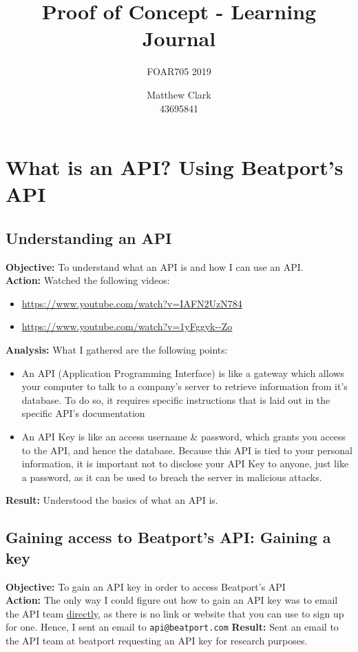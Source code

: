 \documentclass{article}
\title{Proof of Concept - Learning Journal}
\subtitle{FOAR705 2019}
\author{Matthew Clark\\43695841}
\date{\vspace{-5ex}} %
\begin{document}
\doublespacing
\maketitle
\newpage
\tableofcontents
\newpage
\section{What is an API? Using Beatport's API}
\subsection{Understanding an API}
\textbf{Objective:} To understand what an API is and how I can use an API.\\
\textbf{Action:} Watched the following videos:
\begin{itemize}
    \item \url{https://www.youtube.com/watch?v=IAFN2UzN784}
    \item \url{https://www.youtube.com/watch?v=1yFggyk--Zo}
\end{itemize}
\textbf{Analysis:} What I gathered are the following points:
\begin{itemize}
    \item An API (Application Programming Interface) is like a gateway which allows your computer to talk to a company's server to retrieve information from it's database. To do so, it requires specific instructions that is laid out in the specific API's documentation
    \item An API Key is like an access username \& password, which grants you access to the API, and hence the database. Because this API is tied to your personal information, it is important not to disclose your API Key to anyone, just like a password, as it can be used to breach the server in malicious attacks.
\end{itemize}
\textbf{Result:} Understood the basics of what an API is.
\subsection{Gaining access to Beatport's API: Gaining a key}
\textbf{Objective:} To gain an API key in order to access Beatport's API\\
\textbf{Action:} The only way I could figure out how to gain an API key was to email the API team \href{https://groups.google.com/forum/#!topic/beatport-api/dUk2nmhDnRo}{directly}, as there is no link or website that you can use to sign up for one. Hence, I sent an email to \verb|api@beatport.com|
\textbf{Result:} Sent an email to the API team at beatport requesting an API key for research purposes.
\end{document}
